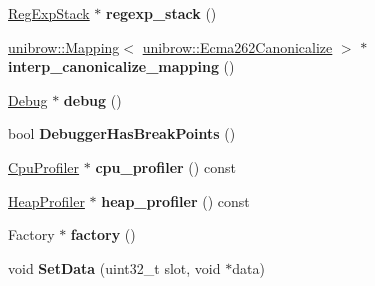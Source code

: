 \begin{DoxyCompactItemize}
\item 
\hypertarget{classv8_1_1internal_1_1_isolate_a93ba4595a63e17be7f29ccd1d5231ee7}{}\hyperlink{classv8_1_1internal_1_1_reg_exp_stack}{Reg\+Exp\+Stack} $\ast$ {\bfseries regexp\+\_\+stack} ()\label{classv8_1_1internal_1_1_isolate_a93ba4595a63e17be7f29ccd1d5231ee7}

\item 
\hypertarget{classv8_1_1internal_1_1_isolate_ab3d2c09b64fcc90f1320c6b368f9e3f1}{}\hyperlink{classunibrow_1_1_mapping}{unibrow\+::\+Mapping}$<$ \hyperlink{structunibrow_1_1_ecma262_canonicalize}{unibrow\+::\+Ecma262\+Canonicalize} $>$ $\ast$ {\bfseries interp\+\_\+canonicalize\+\_\+mapping} ()\label{classv8_1_1internal_1_1_isolate_ab3d2c09b64fcc90f1320c6b368f9e3f1}

\item 
\hypertarget{classv8_1_1internal_1_1_isolate_a5dd8bb2f8e59eea510c69a2062c5032e}{}\hyperlink{classv8_1_1internal_1_1_debug}{Debug} $\ast$ {\bfseries debug} ()\label{classv8_1_1internal_1_1_isolate_a5dd8bb2f8e59eea510c69a2062c5032e}

\item 
\hypertarget{classv8_1_1internal_1_1_isolate_a35b45c9ea5f4d52f69777c0069ea0993}{}bool {\bfseries Debugger\+Has\+Break\+Points} ()\label{classv8_1_1internal_1_1_isolate_a35b45c9ea5f4d52f69777c0069ea0993}

\item 
\hypertarget{classv8_1_1internal_1_1_isolate_ada91c31eaf4c0816b99a2e5207d98989}{}\hyperlink{classv8_1_1internal_1_1_cpu_profiler}{Cpu\+Profiler} $\ast$ {\bfseries cpu\+\_\+profiler} () const \label{classv8_1_1internal_1_1_isolate_ada91c31eaf4c0816b99a2e5207d98989}

\item 
\hypertarget{classv8_1_1internal_1_1_isolate_a75f744e0609fb00cdb95838fe965a4c3}{}\hyperlink{classv8_1_1internal_1_1_heap_profiler}{Heap\+Profiler} $\ast$ {\bfseries heap\+\_\+profiler} () const \label{classv8_1_1internal_1_1_isolate_a75f744e0609fb00cdb95838fe965a4c3}

\item 
\hypertarget{classv8_1_1internal_1_1_isolate_af64b78f074da3809c636b9d3dce4d2d7}{}Factory $\ast$ {\bfseries factory} ()\label{classv8_1_1internal_1_1_isolate_af64b78f074da3809c636b9d3dce4d2d7}

\item 
\hypertarget{classv8_1_1internal_1_1_isolate_aaeb394d75f5a876203b380a110ada080}{}void {\bfseries Set\+Data} (uint32\+\_\+t slot, void $\ast$data)\label{classv8_1_1internal_1_1_isolate_aaeb394d75f5a876203b380a110ada080}


\end{DoxyCompactItemize}
